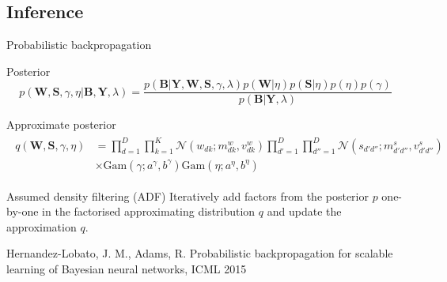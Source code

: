 \documentclass[9pt]{beamer}
\begin{document}
\subsection[Inference]{Inference}
\begin{frame}{Probabilistic backpropagation}
\begin{block}{Posterior}
 \begin{equation*}
  p(\mathbf{W}, \mathbf{S}, \gamma, \eta | \mathbf{B}, \mathbf{Y}, \lambda)
  = \frac{p(\mathbf{B} | \mathbf{Y}, \mathbf{W},  \mathbf{S}, \gamma, \lambda) p(\mathbf{W} | \eta )p(\mathbf{S} | \eta) p(\eta) p(\gamma)}{p(\mathbf{B} | \mathbf{Y}, \lambda)}
  \end{equation*}
  \end{block}

\begin{block}{Approximate posterior}
\begin{align*}
\begin{split}
q(\mathbf{W}, \mathbf{S}, \gamma, \eta) &= \prod_{d=1}^D\prod_{k=1}^K \mathcal{N}(w_{dk} ; m^w_{dk}, v^w_{dk}) \prod_{d'=1}^D\prod_{d''=1}^D \mathcal{N}(s_{d'd''} ; m^s_{d'd''}, v^s_{d'd''}) \\
&\times \text{Gam}(\gamma; a^\gamma, b^\gamma) \text{Gam}(\eta; a^\eta, b^\eta)
\end{split}
\end{align*}
  \end{block}

\begin{block}{Assumed density filtering (ADF)}
Iteratively add factors from the posterior $p$ one-by-one in the factorised approximating distribution $q$ and update the approximation $q$. 
\end{block}

\footnotesize{Hernandez-Lobato, J. M., Adams, R. Probabilistic backpropagation for scalable learning of Bayesian neural networks, ICML 2015}
\end{frame}
\end{document}
